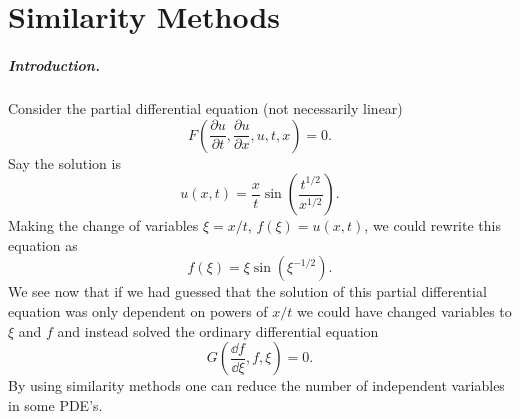 \flushbottom




\chapter{Similarity Methods}







\paragraph{Introduction.}  
Consider the partial differential equation (not necessarily linear)
\[ F \left( \frac{\partial u}{\partial t}, \frac{\partial u}{\partial x}, u, t, x \right) = 0. \]
Say the solution is
\[ u(x,t) = \frac{x}{t} \sin \left( \frac{t^{1/2}}{x^{1/2}} \right).\]
Making the change of variables $\xi = x/t$, $f(\xi) = u(x,t)$, we could
rewrite this equation as
\[f(\xi) = \xi \sin \left( \xi^{-1/2} \right). \]
We see now that if we had guessed that the solution of this partial
differential equation was only dependent on powers of $x/t$ we could have
changed variables to $\xi$ and $f$ and instead solved the ordinary differential
equation
\[ G \left( \frac{\dd f}{\dd \xi}, f, \xi \right) = 0. \]
By using similarity methods one can reduce the number of independent
variables in some PDE's.


